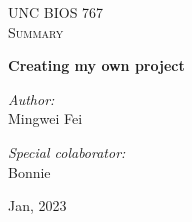 \begin{titlepage}
\vbox{ }

\vbox{ }

\begin{center}
\textsc{\LARGE UNC BIOS 767}\\[1.5cm]
\textsc{\Large Summary}\\[0.5cm]

\vbox{ }

{ \huge \bfseries Creating my own project}\\[0.4cm]

\begin{minipage}{0.4\textwidth}
\begin{flushleft} \large
\emph{Author:}\\
Mingwei Fei
\end{flushleft}
\end{minipage}
\begin{minipage}{0.4\textwidth}
\begin{flushright} \large
\emph{Special colaborator:} \\
Bonnie
\end{flushright}
\end{minipage}
\vfill
{\large Jan, 2023}
\end{center}
\end{titlepage}